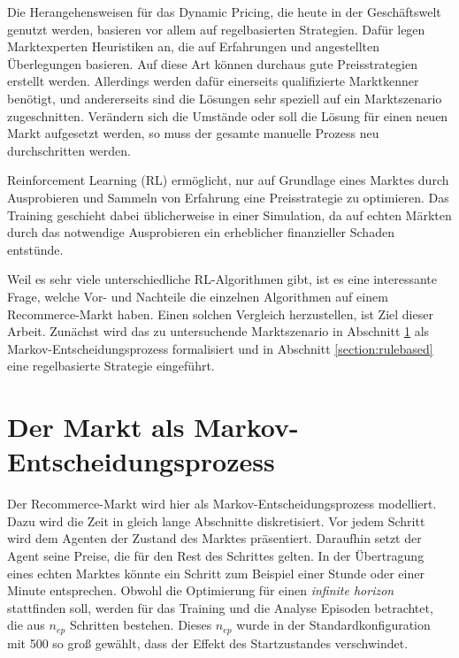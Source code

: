 Die Herangehensweisen für das Dynamic Pricing, die heute in der Geschäftswelt genutzt werden, basieren vor allem auf regelbasierten Strategien.
Dafür legen Marktexperten Heuristiken an, die auf Erfahrungen und angestellten Überlegungen basieren.
Auf diese Art können durchaus gute Preisstrategien erstellt werden.
Allerdings werden dafür einerseits qualifizierte Marktkenner benötigt, und andererseits sind die Lösungen sehr speziell auf ein Marktszenario zugeschnitten.
Verändern sich die Umstände oder soll die Lösung für einen neuen Markt aufgesetzt werden, so muss der gesamte manuelle Prozess neu durchschritten werden.

Reinforcement Learning (RL) ermöglicht, nur auf Grundlage eines Marktes durch Ausprobieren und Sammeln von Erfahrung eine Preisstrategie zu optimieren.
Das Training geschieht dabei üblicherweise in einer Simulation, da auf echten Märkten durch das notwendige Ausprobieren ein erheblicher finanzieller Schaden entstünde.

Weil es sehr viele unterschiedliche RL-Algorithmen gibt, ist es eine interessante Frage, welche Vor- und Nachteile die einzelnen Algorithmen auf einem Recommerce-Markt haben.
Einen solchen Vergleich herzustellen, ist Ziel dieser Arbeit.
Zunächst wird das zu untersuchende Marktszenario in Abschnitt \ref{section:markov} als Markov-Entscheidungsprozess formalisiert und in Abschnitt \ref{section:rulebased} eine regelbasierte Strategie eingeführt.

\section{Der Markt als Markov-Entscheidungsprozess}
\label{section:markov}
Der Recommerce-Markt wird hier als Markov-Entscheidungsprozess modelliert.
Dazu wird die Zeit in gleich lange Abschnitte diskretisiert.
Vor jedem Schritt wird dem Agenten der Zustand des Marktes präsentiert.
Daraufhin setzt der Agent seine Preise, die für den Rest des Schrittes gelten.
In der Übertragung eines echten Marktes könnte ein Schritt zum Beispiel einer Stunde oder einer Minute entsprechen.
Obwohl die Optimierung für einen \textit{infinite horizon} stattfinden soll, werden für das Training und die Analyse Episoden betrachtet, die aus $n_{ep}$ Schritten bestehen.
Dieses $n_{ep}$ wurde in der Standardkonfiguration mit 500 so groß gewählt, dass der Effekt des Startzustandes verschwindet.

